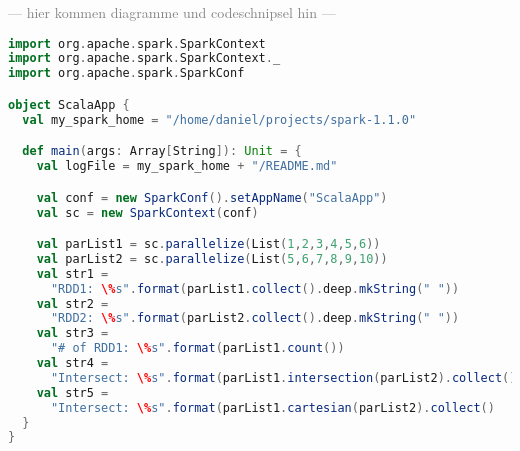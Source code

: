 \textcolor{gray}{--- hier kommen diagramme und codeschnipsel hin ---}\\

\begin{lstlisting}[language=Scala, caption=Treiber für Testanwendung (Programmiersprache Scala)]
import org.apache.spark.SparkContext
import org.apache.spark.SparkContext._
import org.apache.spark.SparkConf

object ScalaApp {
  val my_spark_home = "/home/daniel/projects/spark-1.1.0"

  def main(args: Array[String]): Unit = {
    val logFile = my_spark_home + "/README.md"

    val conf = new SparkConf().setAppName("ScalaApp")
    val sc = new SparkContext(conf)

    val parList1 = sc.parallelize(List(1,2,3,4,5,6))
    val parList2 = sc.parallelize(List(5,6,7,8,9,10))
    val str1 = 
      "RDD1: \%s".format(parList1.collect().deep.mkString(" "))
    val str2 = 
      "RDD2: \%s".format(parList2.collect().deep.mkString(" "))
    val str3 = 
      "# of RDD1: \%s".format(parList1.count())
    val str4 = 
      "Intersect: \%s".format(parList1.intersection(parList2).collect()
    val str5 = 
      "Intersect: \%s".format(parList1.cartesian(parList2).collect()
  }
}
\end{lstlisting}


